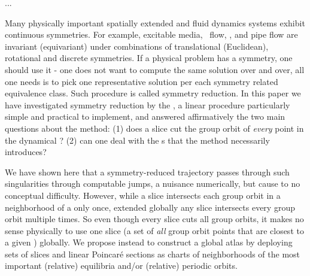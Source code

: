 

\ifboyscout
	...
\fi

Many physically important spatially extended and fluid dynamics systems
exhibit continuous symmetries. For example,  excitable
media, \KS\
flow, {\pCf}, and
pipe flow\rf{Wk04,Kerswell05} are invariant (equivariant) under
combinations of translational (Euclidean), rotational and discrete
symmetries. If a physical problem has a symmetry, one should use it - one
does not want to compute the same solution over and over, all one needs
is to pick one representative solution per each symmetry related
equivalence class. Such procedure is called symmetry reduction.  In this
paper we have investigated symmetry reduction by the \mslices, a linear
procedure particularly simple and practical to implement, and answered
affirmatively the two main questions about the method:
(1) does a slice cut the group orbit of \emph{every} point in the
dynamical \statesp?
(2) can one deal with the {\sset s} that the method necessarily
introduces?

We have shown here that a symmetry-reduced trajectory passes through such
singularities through computable jumps, a nuisance numerically, but cause
to no conceptual difficulty. However, while a slice intersects each group
orbit in a neighborhood of a {\template} only once, extended globally any
slice intersects every group orbit multiple times. So even though every
slice cuts all group orbits, it makes no sense physically to use one
slice (a set of \emph{all} group orbit points that are closest to a given
{\template}) globally. We propose instead to construct a global atlas by
deploying sets of slices and linear Poincar\'e sections as charts of
neighborhoods of the most important (relative) equilibria and/or
(relative) periodic orbits.

